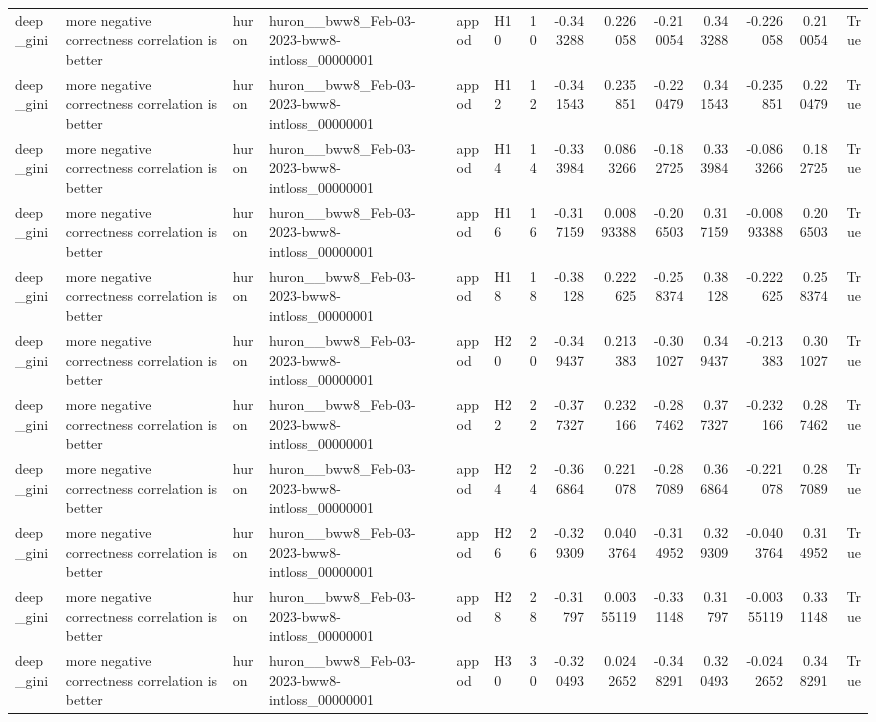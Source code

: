 \begin{longtable}{llllllrrrrrrrr}
deep\_gini & more negative correctness correlation is better & huron & huron\_\_bww8\_Feb-03-2023-bww8-intloss\_00000001 & appod & H10 & 10 & -0.343288 & 0.226058 & -0.210054 & 0.343288 & -0.226058 & 0.210054 & True \\
deep\_gini & more negative correctness correlation is better & huron & huron\_\_bww8\_Feb-03-2023-bww8-intloss\_00000001 & appod & H12 & 12 & -0.341543 & 0.235851 & -0.220479 & 0.341543 & -0.235851 & 0.220479 & True \\
deep\_gini & more negative correctness correlation is better & huron & huron\_\_bww8\_Feb-03-2023-bww8-intloss\_00000001 & appod & H14 & 14 & -0.333984 & 0.0863266 & -0.182725 & 0.333984 & -0.0863266 & 0.182725 & True \\
deep\_gini & more negative correctness correlation is better & huron & huron\_\_bww8\_Feb-03-2023-bww8-intloss\_00000001 & appod & H16 & 16 & -0.317159 & 0.00893388 & -0.206503 & 0.317159 & -0.00893388 & 0.206503 & True \\
deep\_gini & more negative correctness correlation is better & huron & huron\_\_bww8\_Feb-03-2023-bww8-intloss\_00000001 & appod & H18 & 18 & -0.38128 & 0.222625 & -0.258374 & 0.38128 & -0.222625 & 0.258374 & True \\
deep\_gini & more negative correctness correlation is better & huron & huron\_\_bww8\_Feb-03-2023-bww8-intloss\_00000001 & appod & H20 & 20 & -0.349437 & 0.213383 & -0.301027 & 0.349437 & -0.213383 & 0.301027 & True \\
deep\_gini & more negative correctness correlation is better & huron & huron\_\_bww8\_Feb-03-2023-bww8-intloss\_00000001 & appod & H22 & 22 & -0.377327 & 0.232166 & -0.287462 & 0.377327 & -0.232166 & 0.287462 & True \\
deep\_gini & more negative correctness correlation is better & huron & huron\_\_bww8\_Feb-03-2023-bww8-intloss\_00000001 & appod & H24 & 24 & -0.366864 & 0.221078 & -0.287089 & 0.366864 & -0.221078 & 0.287089 & True \\
deep\_gini & more negative correctness correlation is better & huron & huron\_\_bww8\_Feb-03-2023-bww8-intloss\_00000001 & appod & H26 & 26 & -0.329309 & 0.0403764 & -0.314952 & 0.329309 & -0.0403764 & 0.314952 & True \\
deep\_gini & more negative correctness correlation is better & huron & huron\_\_bww8\_Feb-03-2023-bww8-intloss\_00000001 & appod & H28 & 28 & -0.31797 & 0.00355119 & -0.331148 & 0.31797 & -0.00355119 & 0.331148 & True \\
deep\_gini & more negative correctness correlation is better & huron & huron\_\_bww8\_Feb-03-2023-bww8-intloss\_00000001 & appod & H30 & 30 & -0.320493 & 0.0242652 & -0.348291 & 0.320493 & -0.0242652 & 0.348291 & True \\

\end{longtable}
